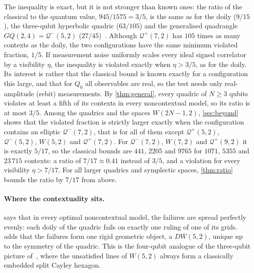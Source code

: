 \documentclass[11pt]{article}
\theoremstyle{definition}
\theoremstyle{remark}
\newcommand{\Qp}{\mathcal{Q}^{+}}
\newcommand{\Qm}{\mathcal{Q}^{-}}
\begin{document}
The inequality is exact, but it is not stronger than known ones: the ratio of the classical to the quantum value, $945/1575=3/5$, is the same as for the doily ($9/15$), the three-qubit hyperbolic quadric ($63/105$) and the generalised quadrangle $GQ(2,4)=\Qm(5,2)$ ($27/45$)~\cite{Kelleher24}.
Although $\Qp(7,2)$ has $105$ times as many contexts as the
doily, the two configurations have the same minimum violated
fraction, $1/5$.
If measurement noise uniformly scales every ideal signed
correlator by a visibility $\eta$, the inequality is violated
exactly when $\eta>3/5$, as for the doily.
Its interest is rather that the classical bound is known exactly for a configuration this large, and that for $Q_0$ all observables are real, so the test needs only real-amplitude (rebit) measurements.
By \cref{thm:general}, every quadric of $N\ge3$ qubits violates at least a fifth of its contexts in every noncontextual model, so its ratio is at most $3/5$.
Among the quadrics and the spaces $W(2N-1,2)$, \cref{sec:beyond} shows that the violated fraction is strictly larger exactly when the configuration contains an elliptic $\Qm(7,2)$, that is for all of them except $\Qp(5,2)$, $\Qm(5,2)$, $W(5,2)$ and $\Qp(7,2)$.
For $\Qm(7,2)$, $W(7,2)$ and $\Qp(9,2)$ it is exactly $5/17$, so the classical bounds are $441$, $2205$ and $9765$ for $1071$, $5355$ and $23\,715$ contexts: a ratio of $7/17\approx0.41$ instead of $3/5$, and a violation for every visibility $\eta>7/17$.
For all larger quadrics and symplectic spaces, \cref{thm:ratio} bounds the ratio by $7/17$ from above.

\paragraph{Where the contextuality sits.}
 says that in every optimal noncontextual model, the failures are spread perfectly evenly: each doily of the quadric fails on exactly one ruling of one of its grids.
 adds that the failures form one rigid geometric object, a $DW(5,2)$, unique up to the symmetry of the quadric.
This is the four-qubit analogue of the three-qubit picture of~\cite{Saniga24hex}, where the unsatisfied lines of $W(5,2)$ always form a classically embedded split Cayley hexagon.
\end{document}
